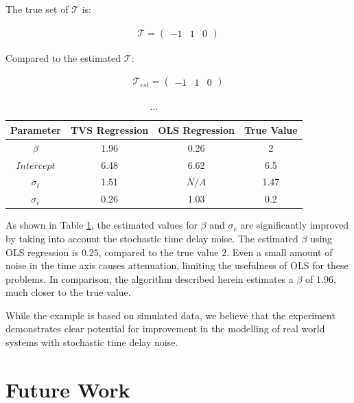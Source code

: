 \documentclass[11pt]{amsart}
\begin{document}
The true set of $\mathcal{T}$ is:

\begin{align}
\mathcal{T} = 
\left(
\begin{array}{ccc}
-1 & 1 & 0 
\end{array}  
\right)
\end{align}

Compared to the estimated $\mathcal{T}$:

\begin{align}
\mathcal{T}_{est} = 
\left(
\begin{array}{ccc}
-1 & 1 & 0 
\end{array}  
\right)
\end{align}



\begin{center}
\begin{table}
\begin{tabular}{c|c|c|c|}
\hline
Parameter & TVS Regression & OLS Regression & True Value \\
\hline
$\beta$ & 1.96 & 0.26 & 2  \\
\hline
$Intercept$ & 6.48 & 6.62 & 6.5 \\
\hline
$\sigma_t$ & 1.51 & $N/A$ & 1.47 \\
\hline
$\sigma_e$ & 0.26 & 1.03 & 0.2 \\
\end{tabular}
\caption{ ... } 
\label{results_table}
\end{table}
\end{center}

As shown in Table \ref{results_table}, the estimated values for $\beta$ and $\sigma_e$ are significantly improved by taking into account the stochastic time delay noise. The estimated $\beta$ using OLS regression is $0.25$, compared to the true value $2$. Even a small amount of noise in the time axis causes attenuation, 
limiting the usefulness of OLS for these problems.
In comparison, the algorithm described herein estimates a $\beta$ of $1.96$, much closer to the true value.

While the example is based on simulated data, we believe that the experiment demonstrates clear potential for improvement in the modelling of real world systems with stochastic time delay noise.


\section{Future Work}
\end{document}
